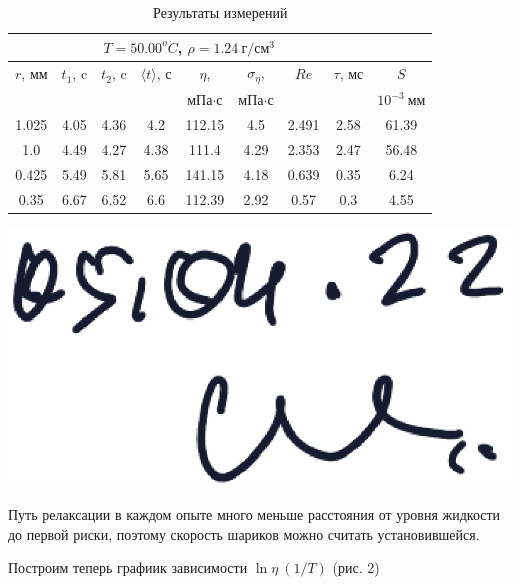 \documentclass[12pt,a4paper]{article}
\begin{document}
\begin{table}[htp]
\begin{tabular}[]{|c|c|c|c|c|c|c|c|c|}
        \hline
        \multicolumn{8}{|c|}{$T = 50.00^oC$, $\rho = 1.24\ г/см^3$}\\
        \hline
        $r$, мм & $t_1$, c & $t_2$, c & $\langle t\rangle $, с & $\eta$,& $\sigma_{\eta}$,& $Re$ & $\tau$, мс & $S$\\
        &&&& мПа$\cdot$с & мПа$\cdot$с &&&$10^{-3}\ мм$\\
        \hline
        1.025  &  4.05 & 4.36 &  4.2  &  112.15  &  4.5  &  2.491  &  2.58  &  61.39 \\ 
        \hline
        1.0  &  4.49 & 4.27 &  4.38  &  111.4  &  4.29  &  2.353  &  2.47  &  56.48 \\ 
        \hline
        0.425  &  5.49 & 5.81 &  5.65  &  141.15  &  4.18  &  0.639  &  0.35  &  6.24 \\ 
        \hline
        0.35  &  6.67 & 6.52 &  6.6  &  112.39  &  2.92  &  0.57  &  0.3  &  4.55 \\ 
        \hline
    \end{tabular}
    \caption{Результаты измерений}
    \begin{flushright}
        \includegraphics[scale=0.1]{sign.jpeg}
    \end{flushright}
\end{table}

Путь релаксации в каждом опыте много меньше расстояния от уровня жидкости до первой риски, поэтому скорость шариков можно считать установившейся.

Построим теперь графиик зависимости $\ln \eta\ (1/T)$ (рис. 2)
\end{document}
